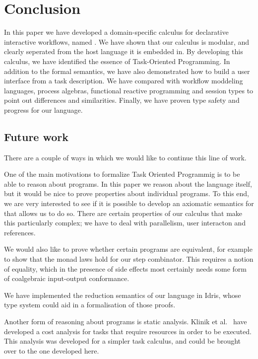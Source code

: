 
\section{Conclusion}

\label{sec:conclusions}

In this paper we have developed a domain-specific calculus for declarative interactive workflows, named \TOPHAT.
We have shown that our calculus is modular, and clearly seperated from the host language it is embedded in.
By developing this calculus, we have identified the essence of Task-Oriented Programming.
In addition to the formal semantics, we have also demonstrated how to build a user interface from a task description.
We have compared \TOPHAT with workflow moddeling languages, process algebras, functional reactive programming and session types to point out differences and similarities.
Finally, we have proven type safety and progress for our language.

\subsection{Future work}

There are a couple of ways in which we would like to continue this line of work.

One of the main motivations to formalize Task Oriented Programmig is to be able to reason about programs.
In this paper we reason about the language itself, but it would be nice to prove properties about individual programs.
To this end, we are very interested to see if it is possible to develop an axiomatic semantics for \TOPHAT that allows us to do so.
There are certain properties of our calculus that make this particularly complex; we have to deal with parallelism, user interacton and references.

We would also like to prove whether certain programs are equivalent, for example to show that the monad laws hold for our step combinator.
This requires a notion of equality, which in the presence of side effects most certainly needs some form of coalgebraic input-output conformance.

We have implemented the reduction semantics of our language in Idris, whose type system could aid in a formalisation of those proofs.

Another form of reasoning about programs is static analysis.
Klinik et al.~\cite{conf/ifl/KlinikJP17} have developed a cost analysis for tasks that require resources in order to be executed.
This analysis was developed for a simpler task calculus, and could be brought over to the one developed here.

